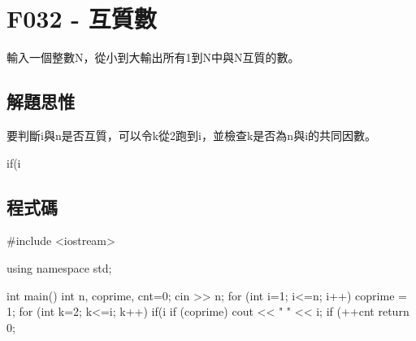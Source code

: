 \section{F032 - 互質數}
輸入一個整數N，從小到大輸出所有1到N中與N互質的數。
\subsection{解題思惟}
要判斷i與n是否互質，可以令k從2跑到i，並檢查k是否為n與i的共同因數。
\begin{inside}
if(i%
\end{inside}
\subsection{程式碼}
\begin{cppcode}
#include <iostream>

using namespace std;

int main()
{
	int n, coprime, cnt=0;
	cin >> n;
	for (int i=1; i<=n; i++) {
		coprime = 1;
		for (int k=2; k<=i; k++) {
			if(i%
		}
		if (coprime) {
			cout << " " << i;
			if (++cnt%
		}
	}
	return 0;
}
\end{cppcode}
